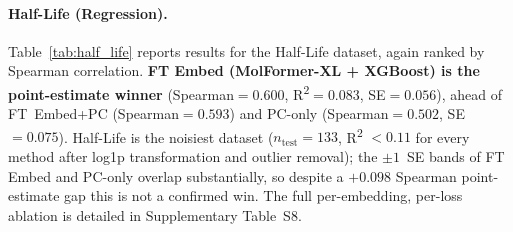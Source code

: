 \documentclass[pdflatex,sn-mathphys-num]{sn-jnl}%
\begin{document}
\begin{table}[!ht]
\centering
\caption{Best configurations on Caco-2 permeability (regression, TDC ADMET Group), ranked by Spearman.}
\label{tab:caco2}
\end{table}

\paragraph{Half-Life (Regression).} Table~\ref{tab:half_life} reports results for the Half-Life dataset, again ranked by Spearman correlation. \textbf{FT Embed (MolFormer-XL + XGBoost) is the point-estimate winner} (Spearman$=0.600$, R\textsuperscript{2}$=0.083$, SE$=0.056$), ahead of FT~Embed+PC (Spearman$=0.593$) and PC-only (Spearman$=0.502$, SE$=0.075$). Half-Life is the noisiest dataset ($n_\text{test}=133$, R\textsuperscript{2} $< 0.11$ for every method after log1p transformation and outlier removal); the $\pm1$~SE bands of FT Embed and PC-only overlap substantially, so despite a $+0.098$ Spearman point-estimate gap this is not a confirmed win. The full per-embedding, per-loss ablation is detailed in Supplementary Table~S8.
\end{document}
